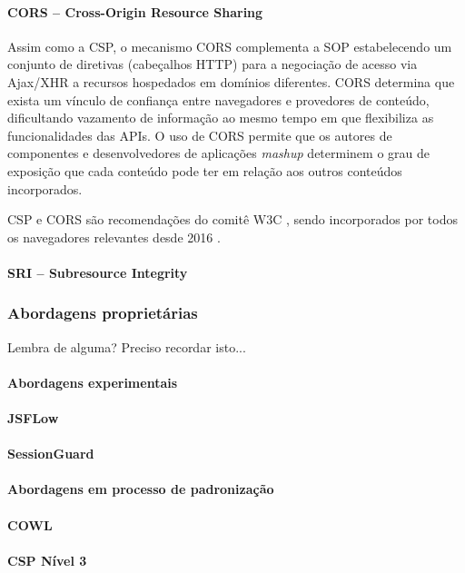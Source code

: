 \paragraph{CORS -- Cross-Origin Resource Sharing}
Assim como a CSP, o mecanismo CORS \cite{W3C:CORS} complementa a SOP estabelecendo um conjunto de diretivas (cabeçalhos HTTP) para a negociação de acesso via Ajax/XHR a recursos hospedados em domínios diferentes. CORS determina que exista um vínculo de confiança entre navegadores e provedores de conteúdo, dificultando vazamento de informação ao mesmo tempo em que flexibiliza as funcionalidades das APIs. O uso de CORS permite que os autores de componentes e desenvolvedores de aplicações \textit{mashup} determinem o grau de exposição que cada conteúdo pode ter em relação aos outros conteúdos incorporados.

CSP e CORS são recomendações do comitê W3C \cite{W3C:CSP} \cite{W3C:CORS}, sendo incorporados por todos os navegadores relevantes desde 2016 \cite{CanIUse:CSP} \cite{CanIUse:CORS}.

\paragraph{SRI -- Subresource Integrity}


\subsubsection{Abordagens proprietárias}
\begin{todo}
Lembra de alguma? Preciso recordar isto...
\end{todo}


\paragraph{Abordagens experimentais}
\paragraph{JSFLow}
\paragraph{SessionGuard}


\paragraph{Abordagens em processo de padronização}
\paragraph{COWL}
\paragraph{CSP Nível 3}
